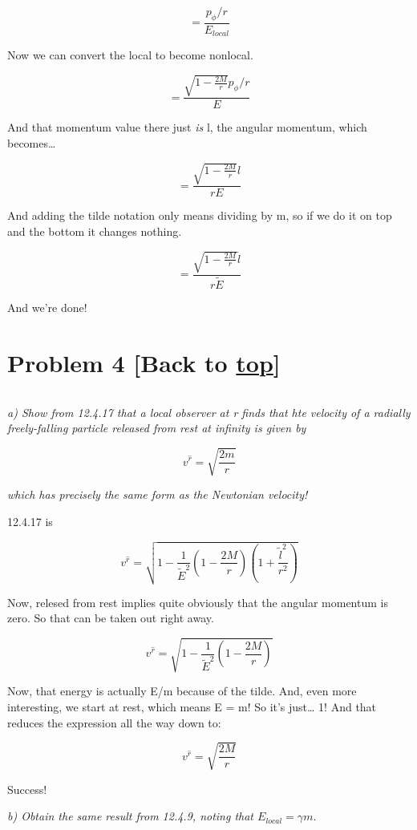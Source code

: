 \documentclass[landscape,letterpaper,10pt,english]{article}
\begin{document}
\[ = \frac{p_\phi/r}{E_{local}} \]

Now we can convert the local to become nonlocal.

\[ = \frac{\sqrt{1-\frac{2M}{r}} p_\phi/r}{E} \]

And that momentum value there just \emph{is} l, the angular momentum,
which becomes\ldots{}

\[ = \frac{\sqrt{1-\frac{2M}{r}} l}{rE} \]

And adding the tilde notation only means dividing by m, so if we do it
on top and the bottom it changes nothing.

\[ = \frac{\sqrt{1-\frac{2M}{r}} \tilde l}{r\tilde E} \]

And we're done!

    \hypertarget{problem-4-back-to-top}{%
\section{\texorpdfstring{Problem 4 {[}Back to
\hyperref[toc]{top}{]}}{Problem 4 {[}Back to {]}}}\label{problem-4-back-to-top}}

\[\label{P4}\]

\emph{a) Show from 12.4.17 that a local observer at r finds that hte
velocity of a radially freely-falling particle released from rest at
infinity is given by}

\[ v^{\hat r} = \sqrt{\frac{2m}{r}} \]

\emph{which has precisely the same form as the Newtonian velocity!}

    12.4.17 is

\[ v^{\hat r} = \sqrt{1 - \frac{1}{\tilde E^2} \left( 1-\frac{2M}{r} \right) \left( 1+\frac{\tilde l^2}{r^2} \right) } \]

    Now, relesed from rest implies quite obviously that the angular momentum
is zero. So that can be taken out right away.

\[ v^{\hat r} = \sqrt{1 - \frac{1}{\tilde E^2} \left( 1-\frac{2M}{r} \right)} \]

    Now, that energy is actually E/m because of the tilde. And, even more
interesting, we start at rest, which means E = m! So it's just\ldots{}
1! And that reduces the expression all the way down to:

\[ v^{\hat r} = \sqrt{\frac{2M}{r}} \]

Success!

    \emph{b) Obtain the same result from 12.4.9, noting that
\(E_{local} = \gamma m.\)}
\end{document}
